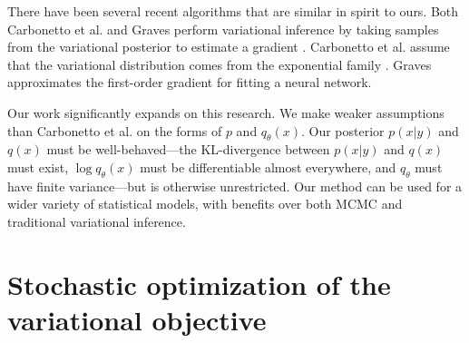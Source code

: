 



There have been several recent algorithms that are similar in spirit
to ours.  Both Carbonetto et al. and Graves perform variational
inference by taking samples from the variational posterior to estimate
a gradient \cite{carbonetto:2009, graves:2011}.  Carbonetto et
al. assume that the variational distribution comes from the
exponential family \cite{carbonetto:2009}.  Graves \cite{graves:2011}
approximates the first-order gradient for fitting a neural network.



Our work significantly expands on this research.  We make weaker
assumptions than Carbonetto et al. \cite{carbonetto:2009} on the forms
of $p$ and $q_\theta(x)$.  Our posterior $p(x | y)$ and $q(x)$ must be
well-behaved---the KL-divergence between $p(x | y)$ and $q(x)$ must
exist, $\log q_\theta(x)$ must be differentiable almost everywhere,
and $q_\theta$ must have finite variance---but is otherwise
unrestricted.  Our method can be used for a wider variety of
statistical models, with benefits over both MCMC and traditional
variational inference.





\section{Stochastic optimization of the variational objective}

